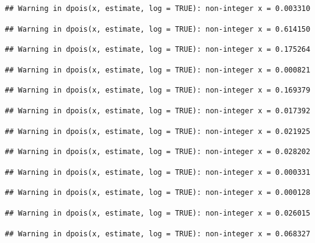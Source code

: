 \documentclass[]{article}
\begin{document}
\begin{verbatim}
## Warning in dpois(x, estimate, log = TRUE): non-integer x = 0.003310
\end{verbatim}

\begin{verbatim}
## Warning in dpois(x, estimate, log = TRUE): non-integer x = 0.614150
\end{verbatim}

\begin{verbatim}
## Warning in dpois(x, estimate, log = TRUE): non-integer x = 0.175264
\end{verbatim}

\begin{verbatim}
## Warning in dpois(x, estimate, log = TRUE): non-integer x = 0.000821
\end{verbatim}

\begin{verbatim}
## Warning in dpois(x, estimate, log = TRUE): non-integer x = 0.169379
\end{verbatim}

\begin{verbatim}
## Warning in dpois(x, estimate, log = TRUE): non-integer x = 0.017392
\end{verbatim}

\begin{verbatim}
## Warning in dpois(x, estimate, log = TRUE): non-integer x = 0.021925
\end{verbatim}

\begin{verbatim}
## Warning in dpois(x, estimate, log = TRUE): non-integer x = 0.028202
\end{verbatim}

\begin{verbatim}
## Warning in dpois(x, estimate, log = TRUE): non-integer x = 0.000331
\end{verbatim}

\begin{verbatim}
## Warning in dpois(x, estimate, log = TRUE): non-integer x = 0.000128
\end{verbatim}

\begin{verbatim}
## Warning in dpois(x, estimate, log = TRUE): non-integer x = 0.026015
\end{verbatim}

\begin{verbatim}
## Warning in dpois(x, estimate, log = TRUE): non-integer x = 0.068327
\end{verbatim}
\end{document}
